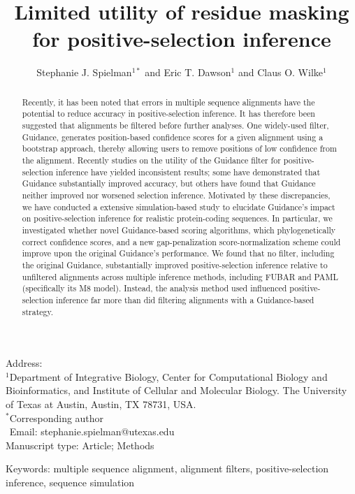 \documentclass[11pt]{article}
\begin{document}
\title{\textbf{Limited utility of residue masking for positive-selection inference}}
\author{Stephanie J. Spielman$^{1*}$ and Eric T. Dawson$^{1}$ and Claus O. Wilke$^{1}$}
\date{}

\maketitle
\noindent
Address:\\
$^1$Department of Integrative Biology, Center for Computational Biology and Bioinformatics, and Institute of Cellular and Molecular Biology.
The University of Texas at Austin, Austin, TX 78731, USA.\\

\bigskip
\noindent
$^*$Corresponding author\\
$\phantom{^*}$Email: stephanie.spielman@utexas.edu\\

\bigskip
\noindent
Manuscript type: Article; Methods

\bigskip
\noindent Keywords: multiple sequence alignment, alignment filters, positive-selection inference, sequence simulation

\newpage
\begin{abstract}
Recently, it has been noted that errors in multiple sequence alignments have the potential to reduce accuracy in positive-selection inference. It has therefore been suggested that alignments be filtered before further analyses. One widely-used filter, Guidance, generates position-based confidence scores for a given alignment using a bootstrap approach, thereby allowing users to remove positions of low confidence from the alignment. Recently studies on the utility of the Guidance filter for positive-selection inference have yielded inconsistent results; some have demonstrated that Guidance substantially improved accuracy, but others have found that Guidance neither improved nor worsened selection inference. Motivated by these discrepancies, we have conducted a extensive simulation-based study to elucidate Guidance's impact on positive-selection inference for realistic protein-coding sequences. In particular, we investigated whether novel Guidance-based scoring algorithms, which phylogenetically correct confidence scores, and a new gap-penalization score-normalization scheme could improve upon the original Guidance's performance. We found that no filter, including the original Guidance, substantially improved positive-selection inference relative to unfiltered alignments across multiple inference methods, including FUBAR and PAML (specifically its M8 model). Instead, the analysis method used influenced positive-selection inference far more than did filtering alignments with a Guidance-based strategy.
\end{abstract}
\end{document}
